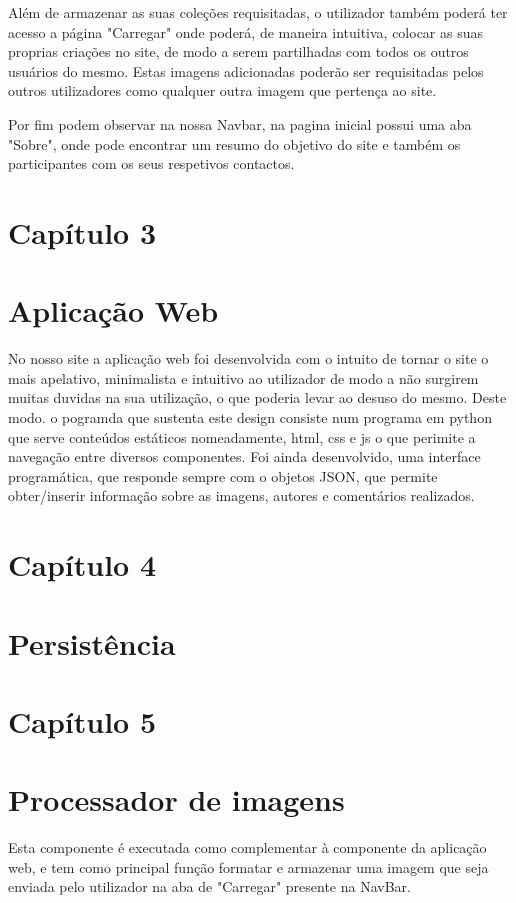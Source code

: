 \documentclass{report}
\begin{document}
Além de armazenar as suas coleções requisitadas, o utilizador também poderá ter acesso a página "Carregar" onde poderá, de maneira intuitiva, colocar as suas proprias criações no site, de modo a serem partilhadas com todos os outros usuários do mesmo. Estas imagens adicionadas poderão ser requisitadas pelos outros utilizadores como qualquer outra imagem que pertença ao site.

Por fim podem observar na nossa Navbar, na pagina inicial possui uma aba "Sobre", onde pode encontrar um resumo do objetivo do site e também os participantes com os seus respetivos contactos. 

\section{Capítulo 3}
\section{Aplicação Web}
No nosso site a aplicação web foi desenvolvida com o intuito de tornar o site o mais apelativo, minimalista e intuitivo ao utilizador de modo a não surgirem muitas duvidas na sua utilização, o que poderia levar ao desuso do mesmo. Deste modo. o pogramda que sustenta este design consiste num programa em python que serve conteúdos estáticos nomeadamente, html, css e js o que perimite a navegação entre diversos componentes. Foi ainda desenvolvido, uma interface programática, que responde sempre com o objetos JSON, que permite obter/inserir informação sobre as imagens, autores e comentários realizados.

\section{Capítulo 4}
\section{Persistência}

\section{Capítulo 5}
\section{Processador de imagens}
Esta componente é executada como complementar à componente da aplicação web, e tem como principal função formatar e armazenar uma imagem que seja enviada pelo utilizador na aba de "Carregar" presente na NavBar.
\end{document}
